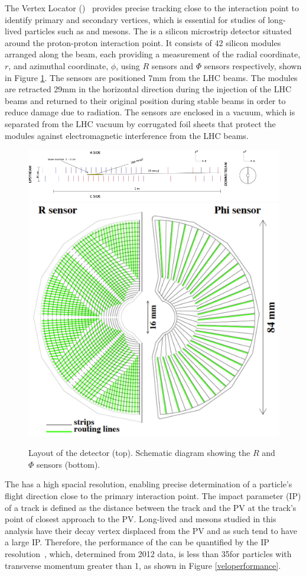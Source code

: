 The Vertex Locator (\velo)~\cite{LHCb-DP-2014-001} provides precise tracking close to the interaction point to identify primary and secondary vertices, which is essential for studies of long-lived particles such as \B and \D mesons. The \velo is a silicon microstrip detector situated around the proton-proton interaction point. It consists of 42 silicon modules arranged along the beam, each providing a measurement of the radial coordinate, $r$, and azimuthal coordinate, $\phi$, using $R$ sensors and $\Phi$ sensors respectively, shown in Figure \ref{velolayout}. The sensors are positioned 7mm from the LHC beams. The \velo modules are retracted 29mm in the horizontal direction during the injection of the LHC beams and returned to their original position during stable beams in order to reduce damage due to radiation. The sensors are enclosed in a vacuum, which is separated from the LHC vacuum by corrugated foil sheets that protect the \velo modules against electromagnetic interference from the LHC beams.

\begin{figure}
\centering
\includegraphics[width=\linewidth]{figures/detector/VELO_detector_layout_crop.pdf}
\hfill
\includegraphics[width=0.3\linewidth]{figures/detector/randphisensors.pdf}
\caption{Layout of the \velo detector (top). Schematic diagram showing the $R$ and $\Phi$ sensors (bottom).}
\label{velolayout}
\end{figure}

The \velo has a high spacial resolution, enabling precise determination of a particle's flight direction close to the primary interaction point. The impact parameter (IP) of a track is defined  as the distance between the track and the PV at the track's point of closest approach to the PV. Long-lived \B and \D mesons studied in this analysis have their decay vertex displaced from the PV and as such tend to have a large IP. Therefore, the performance of the \velo can be quantified by the IP resolution~\cite{LHCb-DP-2014-001}, which, determined from 2012 data, is less than 35\mum for particles with transverse momentum greater than 1\gevc, as shown in Figure \ref{veloperformance}.

